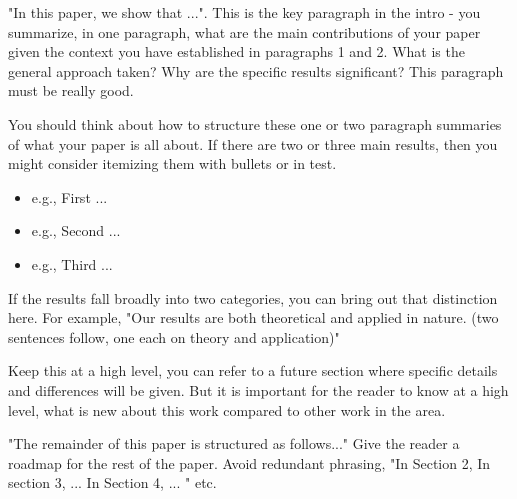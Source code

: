 {}
"In this paper, we show that ...". 
This is the key paragraph in the intro - you summarize, 
in one paragraph, 
what are the main contributions of your paper given the context 
you have established in paragraphs 1 and 2. 
What is the general approach taken? 
Why are the specific results significant? 
This paragraph must be really good. 

You should think about how to structure these one or 
two paragraph summaries of what your paper is all about. 
If there are two or three main results, 
then you might consider itemizing them with bullets or in test. 
\begin{itemize}
	\item e.g., First ...
	\item e.g., Second ...
	\item e.g., Third ...
\end{itemize}
If the results fall broadly into two categories, 
you can bring out that distinction here. 
For example, "Our results are both theoretical and applied in nature. 
(two sentences follow, one each on theory and application)"

{}
Keep this at a high level, 
you can refer to a future section where specific details and differences will be given. 
But it is important for the reader to know at a high level, 
what is new about this work compared to other work in the area.

{}
"The remainder of this paper is structured as follows..." 
Give the reader a roadmap for the rest of the paper. 
Avoid redundant phrasing, 
"In Section 2, In section 3, ... In Section 4, ... " etc.



